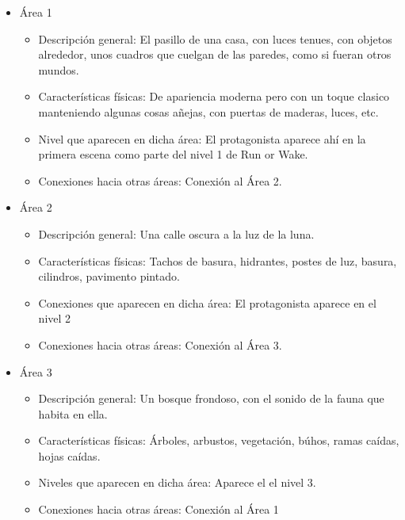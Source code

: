 \begin{itemize}
	\item Área 1
	      \begin{itemize}
		      \item Descripción general: El pasillo de una casa, con luces tenues, con
		            objetos alrededor, unos cuadros que cuelgan de las paredes, como si fueran
		            otros mundos.
		      \item Características físicas: De apariencia moderna pero con un toque
		            clasico manteniendo algunas cosas añejas, con puertas de maderas, luces, etc.
		      \item Nivel que aparecen en dicha área: El protagonista aparece ahí en la
		            primera escena como parte del nivel 1 de Run or Wake.
		      \item Conexiones hacia otras áreas: Conexión al Área 2.
	      \end{itemize}
	\item Área 2
	      \begin{itemize}
		      \item Descripción general: Una calle oscura a la luz de la luna.
		      \item Características físicas: Tachos de basura, hidrantes, postes de luz, basura,
		            cilindros, pavimento pintado.
		      \item Conexiones que aparecen en dicha área: El protagonista aparece en el nivel 2
		      \item Conexiones hacia otras áreas: Conexión al Área 3.
	      \end{itemize}
	\item Área 3
	      \begin{itemize}
		      \item Descripción general: Un bosque frondoso, con el sonido de la fauna
		            que habita en ella.
		      \item Características físicas: Árboles, arbustos, vegetación, búhos, ramas caídas, hojas
		            caídas.
		      \item Niveles que aparecen en dicha área: Aparece el el nivel 3.
		      \item Conexiones hacia otras áreas: Conexión al Área 1
	      \end{itemize}
\end{itemize}

